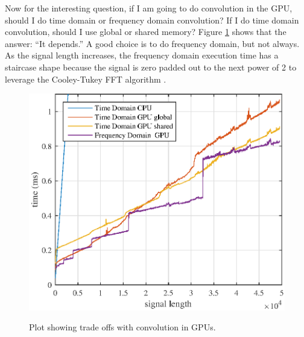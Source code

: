 Now for the interesting question, if I am going to do convolution in the GPU, should I do time domain or frequency domain convolution?
If I do time domain convolution, should I use global or shared memory?
Figure \ref{fig:CPUvsGPU_GPUtoGPU} shows that the answer: ``It depends.''
A good choice is to do frequency domain, but not always.
As the signal length increases, the frequency domain execution time has a staircase shape because the signal is zero padded out to the next power of 2 to leverage the Cooley-Tukey FFT algorithm \cite{Cooley-Tukey_old}.
\begin{figure}
	\caption{Plot showing trade offs with convolution in GPUs.}
	\centering\includegraphics[width=5in]{figures/gpu_intro/CPUvsGPU_GPUtoGPU.eps}
	\label{fig:CPUvsGPU_GPUtoGPU}
\end{figure}

